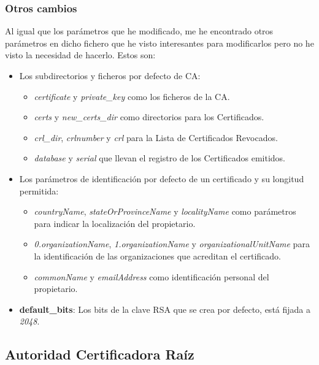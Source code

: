 \documentclass[a4paper, 11pt]{article}
\begin{document}
		\subsubsection{Otros cambios}
			Al igual que los parámetros que he modificado, me he encontrado otros parámetros en dicho fichero que he visto
			interesantes para modificarlos pero no he visto la necesidad de hacerlo. Estos son:
			\begin{itemize}
				\item Los subdirectorios y ficheros por defecto de CA:
				\begin{itemize}
					\item \textit{certificate} y \textit{private\_key} como los ficheros de la CA.
					
					\item \textit{certs} y \textit{new\_certs\_dir} como directorios para los Certificados.
					
					\item \textit{crl\_dir}, \textit{crlnumber} y \textit{crl} para la Lista de Certificados Revocados.
					
					\item \textit{database} y \textit{serial} que llevan el registro de los Certificados emitidos.
				\end{itemize}
				
				\item Los parámetros de identificación por defecto de un certificado y su longitud permitida:
				\begin{itemize}
					\item \textit{countryName}, \textit{stateOrProvinceName} y \textit{localityName} como parámetros para
					indicar la localización del propietario.
					
					\item \textit{0.organizationName}, \textit{1.organizationName} y \textit{organizationalUnitName} para
					la identificación de las organizaciones que acreditan el certificado.
					
					\item \textit{commonName} y \textit{emailAddress} como identificación personal del propietario.
				\end{itemize}
				
				\item \textbf{default\_bits}: Los bits de la clave RSA que se crea por defecto, está fijada a \textit{2048}.
			\end{itemize}
			
	\subsection{Autoridad Certificadora Raíz}
\end{document}
